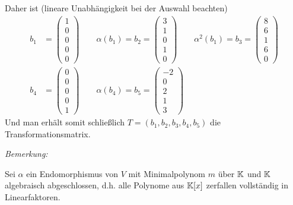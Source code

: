     Daher ist (lineare Unabhängigkeit bei der Auswahl beachten)
    \begin{align*}
        b_1 & =
        \begin{pmatrix}
            1\\0\\0\\0\\0
        \end{pmatrix}
        \qquad \alpha(b_1) = b_2 =
        \begin{pmatrix}
            3\\1\\0\\1\\0
        \end{pmatrix}
        \qquad \alpha^2(b_1) = b_3 =
        \begin{pmatrix}
            8\\6\\1\\6\\0
        \end{pmatrix}\\
        b_4 & =
        \begin{pmatrix}
            0\\0\\0\\0\\1
        \end{pmatrix}
        \qquad \alpha(b_4) = b_5 =
        \begin{pmatrix}
            -2\\0\\2\\1\\3
        \end{pmatrix}
    \end{align*}
    Und man erhält somit schließlich $T=(b_1,b_2,b_3,b_4,b_5)$ die Transformationsmatrix.

\textit{Bemerkung:}

    Sei $\alpha$ ein Endomorphismus von $V$ mit Minimalpolynom $m$ über $\mathbb{K}$ und $\mathbb{K}$ algebraisch abgeschlossen, d.h. alle Polynome aus $\mathbb{K}[x]$ zerfallen vollständig in Linearfaktoren.


